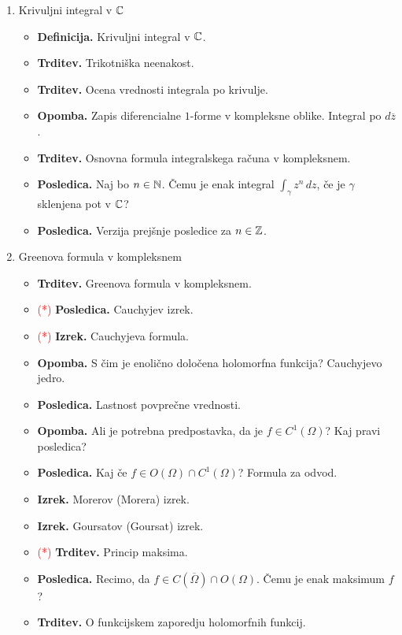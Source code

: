 \begin{enumerate}
    \item Krivuljni integral v \(\mathbb{C}\)
    \begin{itemize}
        \item \textbf{Definicija.} Krivuljni integral v \(\mathbb{C}\).
        \item \textbf{Trditev.} Trikotniška neenakost.
        \item \textbf{Trditev.} Ocena vrednosti integrala po krivulje.
        \item \textbf{Opomba.} Zapis diferencialne \(1\)-forme v kompleksne oblike. Integral po \(d\overline{z}\).
        \item \textbf{Trditev.} Osnovna formula integralskega računa v kompleksnem.
        \item \textbf{Posledica.} Naj bo \(n \in \mathbb{N}\). Čemu je enak integral \(\int_{\gamma} z^n \, dz\), če je \(\gamma\) sklenjena pot v \(\mathbb{C}\)?
        \item \textbf{Posledica.} Verzija prejšnje posledice za \(n \in \mathbb{Z}\).
    \end{itemize}

    \item Greenova formula v kompleksnem
    \begin{itemize}
        \item \textbf{Trditev.} Greenova formula v kompleksnem.
        \item \textcolor{red}{(*)} \textbf{Posledica.} Cauchyjev izrek.
        \item \textcolor{red}{(*)} \textbf{Izrek.} Cauchyjeva formula.
        \item \textbf{Opomba.} S čim je enolično določena holomorfna funkcija? Cauchyjevo jedro.
        \item \textbf{Posledica.} Lastnost povprečne vrednosti.
        \item \textbf{Opomba.} Ali je potrebna predpostavka, da je \(f \in C^1(\Omega)\)? Kaj pravi posledica?
        \item \textbf{Posledica.} Kaj če \(f \in O(\Omega) \cap C^1(\Omega)\)? Formula za odvod.
        \item \textbf{Izrek.} Morerov (Morera) izrek.
        \item \textbf{Izrek.} Goursatov (Goursat) izrek. 
        \item \textcolor{red}{(*)} \textbf{Trditev.} Princip maksima.
        \item \textbf{Posledica.}  Recimo, da \(f \in C(\overline{\Omega}) \cap O(\Omega)\). Čemu je enak maksimum \(f\)?
        \item \textbf{Trditev.} O funkcijskem zaporedju holomorfnih funkcij.
    \end{itemize}


\end{enumerate}

